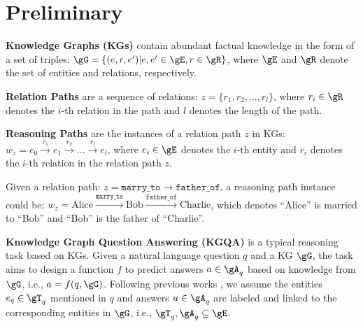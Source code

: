 \section{Preliminary}

\noindent\textbf{Knowledge Graphs (KGs)} contain abundant factual knowledge in the form of a set of triples: $\gG=\{(e,r,e')|e,e'\in\gE,r\in\gR\}$, where $\gE$ and $\gR$ denote the set of entities and relations, respectively.

\noindent\textbf{Relation Paths} are a sequence of relations: $z=\{r_1,r_2,\dots,r_l\}$, where $r_i\in\gR$ denotes the $i$-th relation in the path and $l$ denotes the length of the path.

\noindent\textbf{Reasoning Paths} are the instances of a relation path $z$ in KGs: $w_z=e_0\xrightarrow{r_1}e_1\xrightarrow{r_2}\ldots\xrightarrow{r_l}e_{l}$, where $e_i\in\gE$ denotes the $i$-th entity and $r_i$ denotes the $i$-th relation in the relation path $z$.
\begin{example}
        Given a relation path: $z=\texttt{marry\_to}\to\texttt{father\_of}$, a reasoning path instance could be: $w_z=\text{Alice}\xrightarrow{\texttt{marry\_to}}\text{Bob}\xrightarrow{\texttt{father\_of}}\text{Charlie}$, which denotes ``Alice'' is married to ``Bob'' and ``Bob'' is the father of ``Charlie''.
\end{example}

\noindent\textbf{Knowledge Graph Question Answering (KGQA)} is a typical reasoning task based on KGs. Given a natural language question $q$ and a KG $\gG$, the task aims to design a function $f$ to predict answers $a\in\gA_q$ based on knowledge from $\gG$, i.e., $a=f(q,\gG)$. Following previous works \citep{sun2019pullnet,jiang2022unikgqa}, we assume the entities $e_q\in\gT_q$ mentioned in $q$ and answers $a\in\gA_q$ are labeled and linked to the corresponding entities in $\gG$, i.e., $\gT_q,\gA_q\subseteq\gE$.